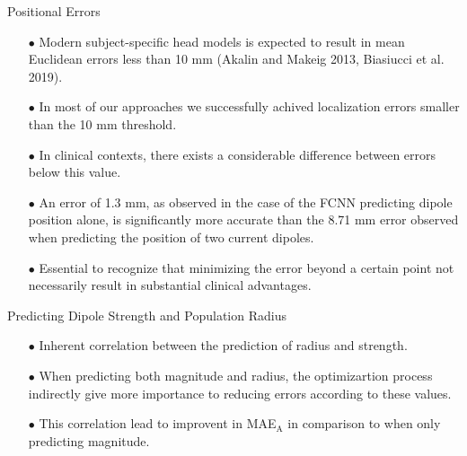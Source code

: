 \documentclass[aspectratio=169, 9pt]{beamer}
\begin{document}
\begin{frame}{Positional Errors}
    \begin{itemize}
      \item[$\bullet$] Modern subject-specific head models is expected to result in mean Euclidean errors less than 10 mm (Akalin and Makeig 2013, Biasiucci et al. 2019).
      \item[$\bullet$] In most of our approaches we successfully achived localization errors smaller than the 10 mm threshold.
      \item[$\bullet$] In clinical contexts, there exists a considerable difference between errors below this value.
      \item[$\bullet$] An error of 1.3 mm, as observed in the case of the FCNN predicting dipole position alone, is significantly more accurate than the 8.71 mm error observed when predicting the position of two current dipoles.
      \item[$\bullet$] Essential to recognize that minimizing the error beyond a certain point not necessarily result in substantial clinical advantages.
    \end{itemize}
\end{frame}

\begin{frame}{Predicting Dipole Strength and Population Radius}
    \begin{itemize}
      \item[$\bullet$] Inherent correlation between the prediction of radius and strength.
      \item[$\bullet$] When predicting both magnitude and radius, the optimizartion process indirectly give more importance to reducing errors according to these values.
      \item[$\bullet$] This correlation lead to improvent in MAE$_{\text{A}}$ in comparison to when only predicting magnitude.
    \end{itemize}
\end{frame}

\end{document}
